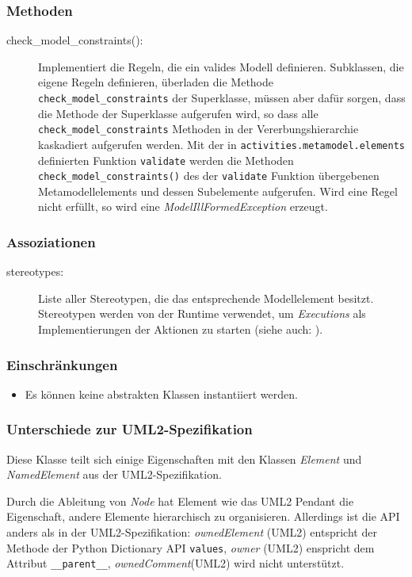 \subsubsection{Methoden}
\begin{description}
\item[check\_model\_constraints():] Implementiert die Regeln, die ein valides Modell definieren. Subklassen, die eigene Regeln definieren, überladen die Methode \texttt{check\_model\_constraints} der Superklasse, müssen aber dafür sorgen, dass die Methode der Superklasse aufgerufen wird, so dass alle \texttt{check\_model\_constraints} Methoden in der Vererbungshierarchie kaskadiert aufgerufen werden. Mit der in \texttt{activities.metamodel.elements} definierten Funktion \texttt{validate} werden die Methoden \texttt{check\_model\_constraints()} des der \texttt{validate} Funktion übergebenen Metamodellelements und dessen Subelemente aufgerufen. Wird eine Regel nicht erfüllt, so wird eine \emph{ModelIllFormedException} erzeugt.
\end{description}

\subsubsection{Assoziationen}
\begin{description}
\item[stereotypes:] Liste aller Stereotypen, die das entsprechende Modellelement besitzt. Stereotypen werden von der Runtime verwendet, um \emph{Executions} als Implementierungen der Aktionen zu starten (siehe auch: ).
\end{description}

\subsubsection{Einschränkungen}
\begin{itemize}
\item Es können keine abstrakten Klassen instantiiert werden.
\end{itemize}

\subsubsection{Unterschiede zur UML2-Spezifikation}
Diese Klasse teilt sich einige Eigenschaften mit den Klassen \emph{Element} und \emph{NamedElement} aus der UML2-Spezifikation.

Durch die Ableitung von \emph{Node} hat Element wie das UML2 Pendant die Eigenschaft, andere Elemente hierarchisch zu organisieren. Allerdings ist die API anders als in der UML2-Spezifikation: \emph{ownedElement} (UML2) entspricht der Methode der Python Dictionary API \texttt{values}, \emph{owner} (UML2) enspricht dem Attribut \texttt{\_\_parent\_\_}, \emph{ownedComment}(UML2) wird nicht unterstützt.

